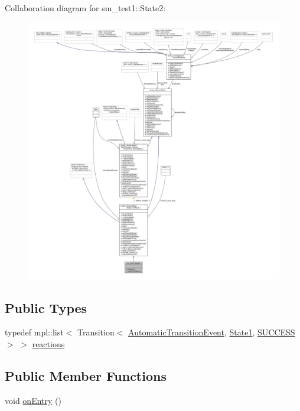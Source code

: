 Collaboration diagram for sm\+\_\+test1\+:\+:State2\+:
\nopagebreak
\begin{figure}[H]
\begin{center}
\leavevmode
\includegraphics[width=350pt]{structsm__test1_1_1State2__coll__graph}
\end{center}
\end{figure}
\subsection*{Public Types}
\begin{DoxyCompactItemize}
\item 
typedef mpl\+::list$<$ Transition$<$ \hyperlink{structsm__test1_1_1AutomaticTransitionEvent}{Automatic\+Transition\+Event}, \hyperlink{structsm__test1_1_1State1}{State1}, \hyperlink{classSUCCESS}{S\+U\+C\+C\+E\+SS} $>$ $>$ \hyperlink{structsm__test1_1_1State2_a8cef0870f3bb2b87bab9ad9450a59b8c}{reactions}
\end{DoxyCompactItemize}
\subsection*{Public Member Functions}
\begin{DoxyCompactItemize}
\item 
void \hyperlink{structsm__test1_1_1State2_a2bbc60d8afa17da9513f811e87f17622}{on\+Entry} ()
\end{DoxyCompactItemize}
